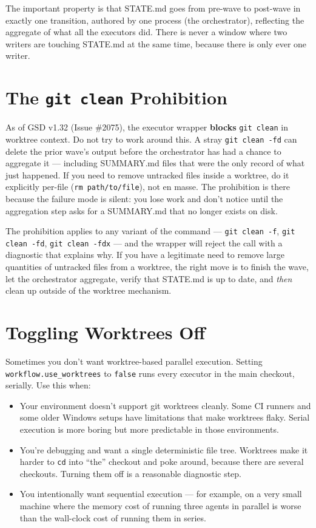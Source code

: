 \documentclass[11pt,letterpaper,openany]{book}
\begin{document}
\noindent
The important property is that STATE.md goes from pre-wave to
post-wave in exactly one transition, authored by one process (the
orchestrator), reflecting the aggregate of what all the executors
did. There is never a window where two writers are touching STATE.md
at the same time, because there is only ever one writer.

\section{The \texttt{git clean} Prohibition}

\begin{gsdwarning}
As of GSD v1.32 (Issue \#2075), the executor wrapper \textbf{blocks}
\texttt{git clean} in worktree context. Do not try to work around
this. A stray \texttt{git clean -fd} can delete the prior wave's
output before the orchestrator has had a chance to aggregate it ---
including SUMMARY.md files that were the only record of what just
happened. If you need to remove untracked files inside a worktree,
do it explicitly per-file (\texttt{rm path/to/file}), not en masse.
The prohibition is there because the failure mode is silent: you
lose work and don't notice until the aggregation step asks for a
SUMMARY.md that no longer exists on disk.
\end{gsdwarning}

The prohibition applies to any variant of the command ---
\texttt{git clean -f}, \texttt{git clean -fd}, \texttt{git clean
-fdx} --- and the wrapper will reject the call with a diagnostic
that explains why. If you have a legitimate need to remove large
quantities of untracked files from a worktree, the right move is to
finish the wave, let the orchestrator aggregate, verify that STATE.md
is up to date, and \emph{then} clean up outside of the worktree
mechanism.

\section{Toggling Worktrees Off}

Sometimes you don't want worktree-based parallel execution. Setting
\texttt{workflow.use\_worktrees} to \texttt{false} runs every
executor in the main checkout, serially. Use this when:

\begin{itemize}
\item Your environment doesn't support git worktrees cleanly. Some
  CI runners and some older Windows setups have limitations that
  make worktrees flaky. Serial execution is more boring but more
  predictable in those environments.
\item You're debugging and want a single deterministic file tree.
  Worktrees make it harder to \texttt{cd} into ``the'' checkout
  and poke around, because there are several checkouts. Turning
  them off is a reasonable diagnostic step.
\item You intentionally want sequential execution --- for example,
  on a very small machine where the memory cost of running three
  agents in parallel is worse than the wall-clock cost of running
  them in series.
\end{itemize}
\end{document}
